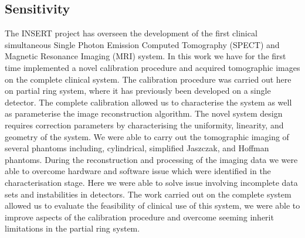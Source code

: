 \subsection{Sensitivity}
The INSERT project has overseen the development
of the first clinical simultaneous Single Photon Emission Computed
Tomography (SPECT) and Magnetic Resonance Imaging
(MRI) system. In this work we have for the first time implemented
a novel calibration procedure and acquired tomographic images
on the complete clinical system. The calibration procedure was
carried out here on partial ring system, where it has previously
been developed on a single detector. The complete calibration
allowed us to characterise the system as well as parameterise
the image reconstruction algorithm. The novel system design
requires correction parameters by characterising the uniformity,
linearity, and geometry of the system. We were able to carry
out the tomographic imaging of several phantoms including,
cylindrical, simplified Jaszczak, and Hoffman phantoms. During
the reconstruction and processing of the imaging data we were
able to overcome hardware and software issue which were
identified in the characterisation stage. Here we were able to
solve issue involving incomplete data sets and instabilities in
detectors. The work carried out on the complete system allowed
us to evaluate the feasibility of clinical use of this system, we
were able to improve aspects of the calibration procedure and
overcome seeming inherit limitations in the partial ring system.

